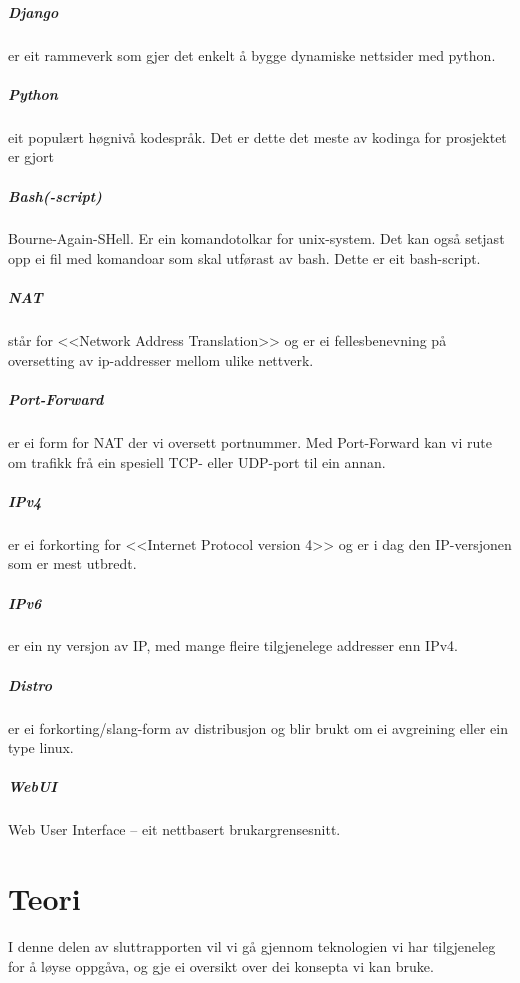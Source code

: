 \documentclass[nynorsk,12pt,a4paper,oneside]{book}
\begin{document}
\paragraph{Django} er eit rammeverk som gjer det enkelt å bygge dynamiske nettsider med python.
\paragraph{Python} eit populært høgnivå kodespråk. Det er dette det meste av kodinga for prosjektet er gjort
\paragraph{Bash(-script)} Bourne-Again-SHell. Er ein komandotolkar for unix-system. Det kan også setjast opp ei fil med komandoar som skal utførast av bash. Dette er eit bash-script.
\paragraph{NAT} står for <<Network Address Translation>> og er ei fellesbenevning på oversetting av ip-addresser mellom ulike nettverk. 
\paragraph{Port-Forward} er ei form for NAT der vi oversett portnummer. Med Port-Forward kan vi rute om trafikk frå ein spesiell TCP- eller UDP-port til ein annan.
\paragraph{IPv4} er ei forkorting for <<Internet Protocol version 4>> og er i dag den IP-versjonen som er mest utbredt. 
\paragraph{IPv6} er ein ny versjon av IP, med mange fleire tilgjenelege addresser enn IPv4. 
\paragraph{Distro} er ei forkorting/slang-form av distribusjon og blir brukt om ei avgreining eller ein type linux.
\paragraph{WebUI} Web User Interface -- eit nettbasert brukargrensesnitt. 

\chapter{Teori}
I denne delen av sluttrapporten vil vi gå gjennom teknologien vi har tilgjeneleg for å løyse oppgåva, og gje ei oversikt over dei konsepta vi kan bruke. 
\end{document}
